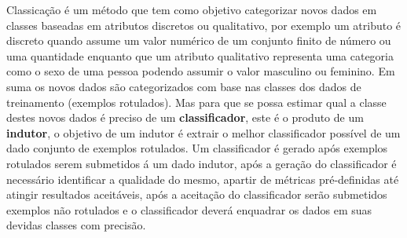 Classicação é um método que tem como objetivo categorizar novos dados em classes baseadas em atributos discretos ou qualitativo,
por exemplo um atributo é discreto quando assume um valor numérico de um conjunto finito de número ou uma quantidade enquanto que um
atributo qualitativo representa uma categoria como o sexo de uma pessoa podendo assumir o valor masculino ou feminino.
Em suma os novos dados são categorizados com base nas classes dos dados de treinamento (exemplos rotulados). 
Mas para que se possa estimar qual a classe destes novos dados é preciso de um \textbf{classificador},
este é o produto de um \textbf{indutor}, o objetivo de um indutor é extrair o melhor classificador possível de um dado 
conjunto de exemplos rotulados.
Um classificador é gerado após exemplos rotulados serem submetidos á um dado indutor, após a geração do classificador 
é necessário identificar a qualidade do mesmo, apartir de métricas pré-definidas até atingir resultados aceitáveis, após a aceitação do classificador 
serão submetidos exemplos não rotulados e o classificador deverá enquadrar os dados em suas devidas classes com precisão. 
\begin{figure}[htb!]
	\centering
\end{figure}  

